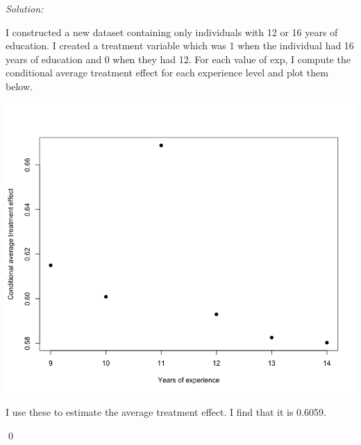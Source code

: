 \documentclass[12pt]{article}
\newenvironment{sol}
    {\emph{Solution:}
    }
    {
    \qed
    }
\begin{document}
\begin{sol}
I constructed a new dataset containing only individuals with 12 or 16 years of education. I created a treatment variable which was 1 when the individual had 16 years of education and 0 when they had 12. For each value of exp, I compute the conditional average treatment effect for each experience level and plot them below.
\begin{center}
    \includegraphics[scale=0.5]{CATE.png}
\end{center}

I use these to estimate the average treatment effect. I find that it is 0.6059.
\end{sol}
\end{document}
